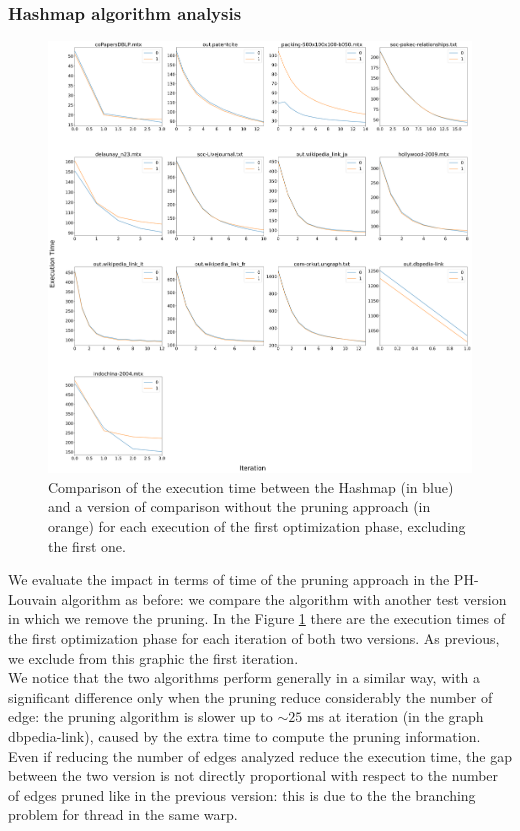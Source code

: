 \subsubsection{Hashmap algorithm analysis}\label{hashmap-analysis}
\begin{figure}[h]
	\centering
	\includegraphics[width=1\linewidth]{0-resources/hash-prune-vs-no-prune}
	\caption{Comparison of the execution time between the Hashmap (in blue) and a version of comparison without the pruning approach (in orange) for each execution of the first optimization phase, excluding the first one. }
	\label{fig:hash-prune-vs-no-prune}
\end{figure}
\noindent We evaluate the impact in terms of time of the pruning approach in the PH-Louvain algorithm as before: we compare the algorithm with another test version in which we remove the pruning. In the Figure \ref{fig:hash-prune-vs-no-prune} there are the execution times of the first optimization phase for each iteration of both two versions. As previous, we exclude from this graphic the first iteration. \\
We notice that the two algorithms perform generally in a similar way, with a significant difference only when the pruning reduce considerably the number of edge: the pruning algorithm is slower up to $\sim25$ ms at iteration (in the graph dbpedia-link), caused by the extra time to compute the pruning information. Even if reducing the number of edges analyzed reduce the execution time, the gap between the two version is not directly proportional with respect to the number of edges pruned like in the previous version: this is due to the the branching problem for thread in the same warp. \\
